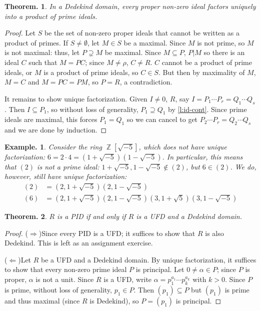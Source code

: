 \documentclass[11pt, a4paper]{memoir}
\DeclareMathOperator{\Z}{{\mathbb{Z}}}
\newcommand{\impendc}{\hspace{0.3cm}}
\newcommand{\iimpr}{($\Rightarrow$)}
\newcommand{\iimpl}{($\Leftarrow$)}
\newcommand{\impr}{\iimpr\impendc}
\newcommand{\impl}{\iimpl\impendc}
\theoremstyle{change}
\newtheorem{theorem}{Theorem.}[section]
\theoremstyle{plain}
\theoremstyle{nonumberplain}
\newtheorem{example}{Example.}
\newtheorem{proof}{Proof}
\numberwithin{equation}{section}
\begin{document}
\begin{theorem}
    In a Dedekind domain, every proper non-zero ideal factors uniquely into a product of prime ideals.
\end{theorem}
\begin{proof}
    Let $S$ be the set of non-zero proper ideals that cannot be written as a product of primes.
    If $S\neq\emptyset$, let $M\in S$ be a maximal.
    Since $M$ is not prime, so $M$ is not maximal: thus, let $P\supsetneq M$ be maximal.
    Since $M\subseteq P$, $P|M$ so there is an ideal $C$ such that $M=PC$; since $M\neq\rho$, $C\neq R$.
    $C$ cannot be a product of prime ideals, or $M$ is a product of prime ideals, so $C\in S$.
    But then by maximality of $M$, $M=C$ and $M=PC=PM$, so $P=R$, a contradiction.

    It remains to show unique factorization.
    Given $I\neq 0$, $R$, say $I=P_1\cdots P_r=Q_1\cdots Q_s$.
    Then $I\subseteq P_1$, so without loss of generality, $P_1\supseteq Q_1$ by \cref{l:id-cont}.
    Since prime ideals are maximal, this forces $P_1=Q_1$ so we can cancel to get $P_2\cdots P_r=Q_2\cdots Q_s$ and we are done by induction.
\end{proof}
\begin{example}
    Consider the ring $\Z[\sqrt{-5}]$, which does not have unique factorization: $6=2\cdot 4=(1+\sqrt{-5})(1-\sqrt{-5})$.
    In particular, this means that $(2)$ is not a prime ideal: $1+\sqrt{-5},1-\sqrt{-5}\notin(2)$, but $6\in(2)$.
    We do, however, still have unique factorization:
    \begin{align*}
        (2)&=(2,1+\sqrt{-5})(2,1-\sqrt{-5})\\
        (6)&=(2,1+\sqrt{-5})(2,1-\sqrt{-5})(3,1+\sqrt{5})(3,1-\sqrt{-5})
    \end{align*}
\end{example}
\begin{theorem}
    $R$ is a PID if and only if $R$ is a UFD and a Dedekind domain.
\end{theorem}
\begin{proof}
    \impr Since every PID is a UFD; it suffices to show that $R$ is also Dedekind.
    This is left as an assignment exercise.

    \impl Let $R$ be a UFD and a Dedekind domain.
    By unique factorization, it suffices to show that every non-zero prime ideal $P$ is principal.
    Let $0\neq\alpha\in P$; since $P$ is proper, $\alpha$ is not a unit.
    Since $R$ is a UFD, write $\alpha=p_1^{a_1}\cdots p_k^{a_k}$ with $k>0$.
    Since $P$ is prime, without loss of generality, $p_1\in P$.
    Then $(p_1)\subseteq P$ but $(p_1)$ is prime and thus maximal (since $R$ is Dedekind), so $P=(p_1)$ is principal.
\end{proof}
\end{document}
